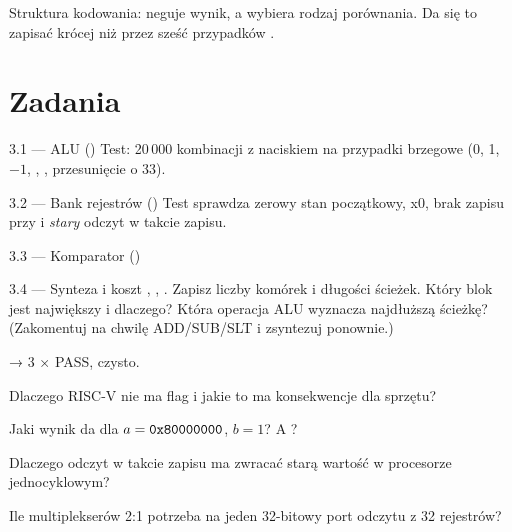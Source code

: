 Struktura kodowania:  neguje wynik, a 
wybiera rodzaj porównania. Da się to zapisać krócej niż przez sześć przypadków
.

\section{Zadania}

\begin{zadanie}{3.1 --- ALU ()}
Test: 20\,000 kombinacji z naciskiem na przypadki brzegowe (0, 1, $-1$,
, , przesunięcie o 33).
\end{zadanie}

\begin{zadanie}{3.2 --- Bank rejestrów ()}
Test sprawdza zerowy stan początkowy, x0, brak zapisu przy  i
\emph{stary} odczyt w takcie zapisu.
\end{zadanie}

\begin{zadanie}{3.3 --- Komparator ()}
\end{zadanie}

\begin{zadanie}{3.4 --- Synteza i koszt}
, , . Zapisz liczby
komórek i długości ścieżek. Który blok jest największy i dlaczego? Która
operacja ALU wyznacza najdłuższą ścieżkę? (Zakomentuj na chwilę ADD/SUB/SLT
i zsyntezuj ponownie.)
\end{zadanie}

\begin{gotowe}
 → 3 × PASS,  czysto.
\end{gotowe}

\begin{kontrolne}
  \item Dlaczego RISC-V nie ma flag i jakie to ma konsekwencje dla sprzętu?
  \item Jaki wynik da  dla $a = \texttt{0x80000000}$, $b = 1$? A ?
  \item Dlaczego odczyt w takcie zapisu ma zwracać starą wartość w procesorze jednocyklowym?
  \item Ile multiplekserów 2:1 potrzeba na jeden 32-bitowy port odczytu z 32 rejestrów?
\end{kontrolne}

